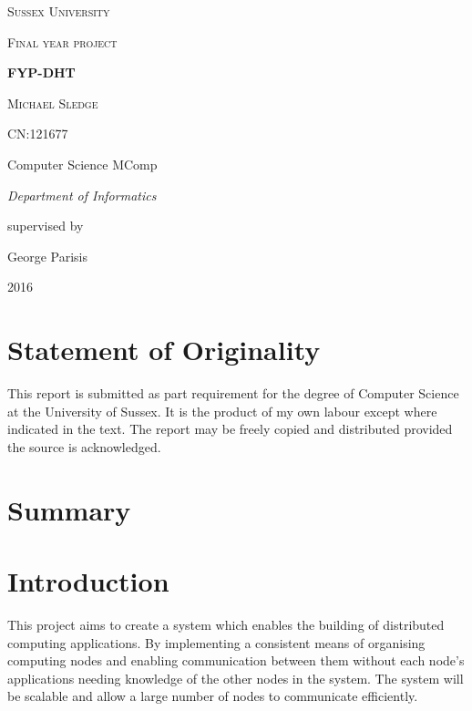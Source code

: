 \documentclass{article}
\begin{document}
\begin{titlepage}
	\centering
	{\scshape\LARGE Sussex University \par}
	\vspace{1cm}
	{\scshape\Large Final year project\par}
	\vspace{1.5cm}
	{\huge\bfseries FYP-DHT\par}
	\vspace{2cm}
	{\Large\scshape Michael Sledge\par}
	{\Large CN:121677\par}
	\vspace{1cm}
	{\Large Computer Science MComp\par}
	{\Large\itshape Department of Informatics\par}
	\vspace{1cm}
	supervised by\par
	George Parisis

	\vfill

	{\large 2016\par}
\end{titlepage}

\section{Statement of Originality}
This report is submitted as part requirement for the degree of Computer Science at the University of Sussex. It is the product of my own labour except where indicated in the text. The report may be freely copied and distributed provided the source is acknowledged.
\newpage

\section{Summary}


\newpage
\tableofcontents
\newpage


\section{Introduction}

This project aims to create a system which  enables the building of distributed computing applications.
By implementing a consistent means of organising computing nodes and enabling communication between them without each node's applications needing knowledge of the other nodes in the system.
The system will be scalable and allow a large number of nodes to communicate efficiently.
\end{document}
